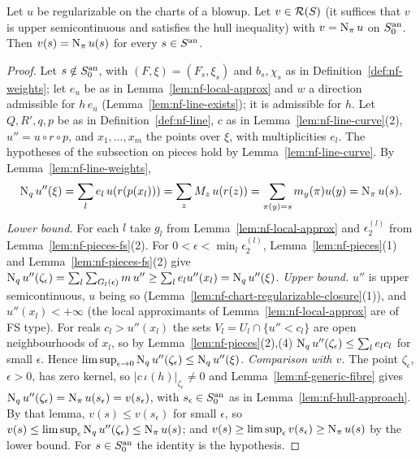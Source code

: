 \begin{proposition}\label{prop:nf-identification}
\leanok
{}
Let $u$ be regularizable on the charts of a blowup. Let $v\in\mathcal{R}(S)$ (it suffices that $v$ is upper semicontinuous and satisfies the hull inequality) with
$v=\operatorname{N}_\pi u$ on $S_0^{\mathrm{an}}$. Then
$v(s)=\operatorname{N}_\pi u(s)$ for every $s\in S^{\mathrm{an}}$.
\end{proposition}

\begin{proof}
Let $s\notin S_0^{\mathrm{an}}$, with $(F,\xi)=(F_s,\xi_s)$ and $b_s,\chi_s$ as in Definition~\ref{def:nf-weights}; let $e_u$ be as
in Lemma~\ref{lem:nf-local-approx} and $w$ a direction admissible for $h\,e_u$ (Lemma~\ref{lem:nf-line-exists}); it is
admissible for $h$. Let $Q,R',q,p$ be as in Definition~\ref{def:nf-line}, $c$ as in Lemma~\ref{lem:nf-line-curve}(2),
$u''=u\circ r\circ p$, and $x_1,\dots,x_m$ the points over $\xi$, with multiplicities $e_l$. The hypotheses of the
subsection on pieces hold by Lemma~\ref{lem:nf-line-curve}. By Lemma~\ref{lem:nf-line-weights},
\[
\operatorname{N}_qu''(\xi)=\sum_le_l\,u(r(p(x_l)))=\sum_zM_z\,u(r(z))=\sum_{\pi(y)=s}m_y(\pi)u(y)=\operatorname{N}_\pi u(s).
\]
\emph{Lower bound.} For each $l$ take $g_l$ from Lemma~\ref{lem:nf-local-approx} and $\epsilon_2^{(l)}$ from
Lemma~\ref{lem:nf-pieces-fs}(2). For $0<\epsilon<\min_l\epsilon_2^{(l)}$, Lemma~\ref{lem:nf-pieces}(1) and
Lemma~\ref{lem:nf-pieces-fs}(2) give
$\operatorname{N}_qu''(\zeta_\epsilon)=\sum_l\sum_{G_l(\epsilon)}m\,u''\ge\sum_le_lu''(x_l)=\operatorname{N}_qu''(\xi)$.
\emph{Upper bound.} $u''$ is upper semicontinuous, $u$ being so (Lemma~\ref{lem:nf-chart-regularizable-closure}(1)), and $u''(x_l)<+\infty$ (the local
approximants of Lemma~\ref{lem:nf-local-approx} are of FS type). For
reals $c_l>u''(x_l)$ the sets $V_l=U_l\cap\{u''<c_l\}$ are open neighbourhoods of $x_l$, so by
Lemma~\ref{lem:nf-pieces}(2),(4) $\operatorname{N}_qu''(\zeta_\epsilon)\le\sum_le_lc_l$ for small $\epsilon$. Hence
$\limsup_{\epsilon\to0}\operatorname{N}_qu''(\zeta_\epsilon)\le\operatorname{N}_qu''(\xi)$.
\emph{Comparison with $v$.} The point $\zeta_\epsilon$, $\epsilon>0$, has zero kernel, so $|c\,\iota(h)|_{\zeta_\epsilon}\ne0$
and Lemma~\ref{lem:nf-generic-fibre} gives $\operatorname{N}_qu''(\zeta_\epsilon)=\operatorname{N}_\pi u(s_\epsilon)=v(s_\epsilon)$, with
$s_\epsilon\in S_0^{\mathrm{an}}$ as in Lemma~\ref{lem:nf-hull-approach}. By that lemma, $v(s)\le v(s_\epsilon)$ for small $\epsilon$,
so $v(s)\le\limsup_\epsilon\operatorname{N}_qu''(\zeta_\epsilon)\le\operatorname{N}_\pi u(s)$; and
$v(s)\ge\limsup_\epsilon v(s_\epsilon)\ge\operatorname{N}_\pi u(s)$ by the lower bound. For $s\in S_0^{\mathrm{an}}$ the identity is the
hypothesis.
\end{proof}

